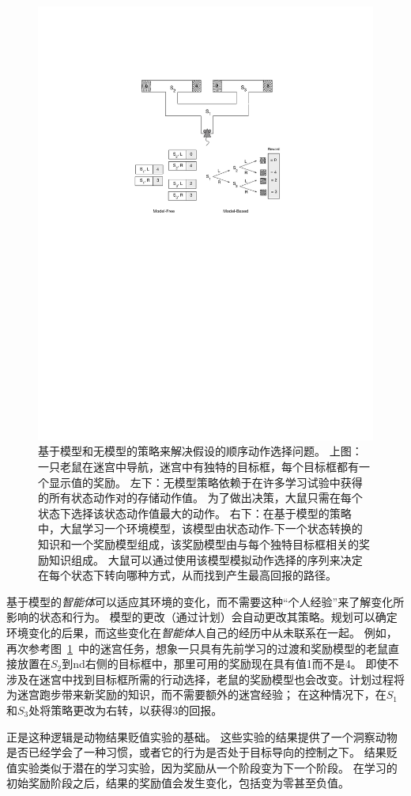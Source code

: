 {{{\begin{figure}[!htb]
	\centering
	\includegraphics[width=0.65\linewidth]{chap11/fig_11_8}
	\caption{基于模型和无模型的策略来解决假设的顺序动作选择问题。
		上图：一只老鼠在迷宫中导航，迷宫中有独特的目标框，每个目标框都有一个显示值的奖励。
		左下：无模型策略依赖于在许多学习试验中获得的所有状态动作对的存储动作值。
		为了做出决策，大鼠只需在每个状态下选择该状态动作值最大的动作。
		右下：在基于模型的策略中，大鼠学习一个环境模型，该模型由状态动作-下一个状态转换的知识和一个奖励模型组成，该奖励模型由与每个独特目标框相关的奖励知识组成。
		大鼠可以通过使用该模型模拟动作选择的序列来决定在每个状态下转向哪种方式，从而找到产生最高回报的路径。
		\label{fig:11_8}}
\end{figure}


基于模型的\textit{智能体}可以适应其环境的变化，而不需要这种“个人经验”来了解变化所影响的状态和行为。
模型的更改（通过计划）会自动更改其策略。规划可以确定环境变化的后果，而这些变化在\textit{智能体}人自己的经历中从未联系在一起。
例如，再次参考图~\ref{fig:11_8}~中的迷宫任务，想象一只具有先前学习的过渡和奖励模型的老鼠直接放置在$ S_2 $到nd右侧的目标框中，那里可用的奖励现在具有值1而不是4。
即使不涉及在迷宫中找到目标框所需的行动选择，老鼠的奖励模型也会改变。计划过程将为迷宫跑步带来新奖励的知识，而不需要额外的迷宫经验；
在这种情况下，在$ S_1 $和$ S_3 $处将策略更改为右转，以获得3的回报。


正是这种逻辑是动物结果贬值实验的基础。
这些实验的结果提供了一个洞察动物是否已经学会了一种习惯，或者它的行为是否处于目标导向的控制之下。
结果贬值实验类似于潜在的学习实验，因为奖励从一个阶段变为下一个阶段。
在学习的初始奖励阶段之后，结果的奖励值会发生变化，包括变为零甚至负值。


}}}
